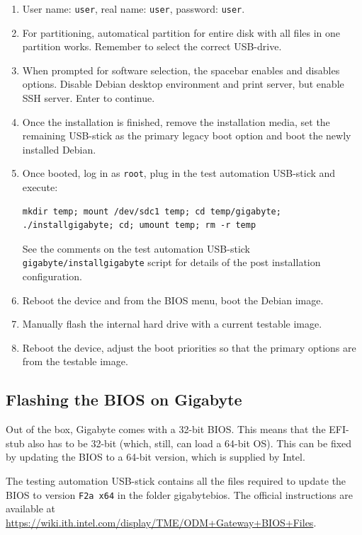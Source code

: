 \documentclass[a4paper,11pt]{article}
\newcommand{\cmd}[1]{\texttt{#1}}
\begin{document}
\begin{enumerate}
\item User name: \cmd{user}, real name: \cmd{user}, password: \cmd{user}.

\item For partitioning, automatical partition for entire disk with all files in one partition works. Remember to select the correct USB-drive.

\item When prompted for software selection, the spacebar enables and disables options. Disable Debian desktop environment and print server, but enable SSH server. Enter to continue.

\item Once the installation is finished, remove the installation media, set the remaining USB-stick as the primary legacy boot option and boot the newly installed Debian.

\item Once booted, log in as \cmd{root}, plug in the test automation USB-stick and execute:

\begin{lstlisting}
mkdir temp; mount /dev/sdc1 temp; cd temp/gigabyte; ./installgigabyte; cd; umount temp; rm -r temp
\end{lstlisting}

See the comments on the test automation USB-stick \cmd{gigabyte/installgigabyte} script for details of the post installation configuration.

\item Reboot the device and from the BIOS menu, boot the Debian image.

\item Manually flash the internal hard drive with a current testable image.

\item Reboot the device, adjust the boot priorities so that the primary options are from the testable image.
\end{enumerate}

\subsection{Flashing the BIOS on Gigabyte}
Out of the box, Gigabyte comes with a 32-bit BIOS. This means that the EFI-stub also has to be 32-bit (which, still, can load a 64-bit OS). This can be fixed by updating the BIOS to a 64-bit version, which is supplied by Intel.

The testing automation USB-stick contains all the files required to update the BIOS to version \cmd{F2a x64} in the folder gigabytebios. The official instructions are available at \url{https://wiki.ith.intel.com/display/TME/ODM+Gateway+BIOS+Files}.
\end{document}
